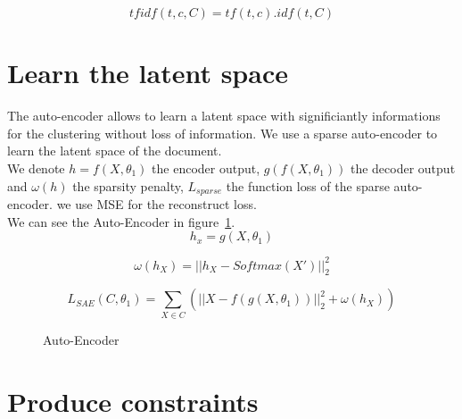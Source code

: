 \documentclass{article}
\begin{document}
\begin{equation}\label{eq:tfidf}
  tfidf(t,c,C) = tf(t,c).idf(t,C)
\end{equation}


\section{Learn the latent space}

The auto-encoder allows to learn a latent space with significiantly
informations for the clustering without loss of information.
We use a sparse auto-encoder to learn the latent space of the document.
\\
We denote $h=f(X, \theta_1)$ the encoder output, $g(f(X, \theta_1))$
the decoder output and $\omega(h)$ the sparsity penalty, $L_{sparse}$
the function loss of the sparse auto-encoder. we use MSE for
the reconstruct loss.
\\
We can see the Auto-Encoder in figure~\ref{fig:archi}.
\begin{equation*}\label{eq:h}
  h_x = g(X, \theta_1)
\end{equation*}

\begin{equation}\label{eq:omega}
  \omega(h_X) = || h_X - Softmax(X')||_2^2
\end{equation}

\begin{equation}\label{eq:Sparse}
  L_{SAE}(C, \theta_1) = \sum_{X \in C}(||X - f(g(X, \theta_1))||_2^2
  + \omega(h_X))  
\end{equation}

\begin{figure}[!t]
  \centering
  
  \caption{Auto-Encoder}
  \label{fig:archi}
\end{figure}

\section{Produce constraints}
\end{document}
